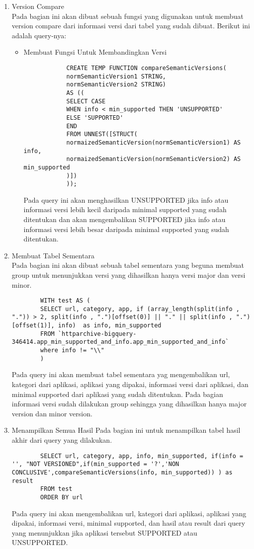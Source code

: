 \begin{enumerate}
\begin{itemize}
	\end{itemize}

	
	\item Version Compare \\
	Pada bagian ini akan dibuat sebuah fungsi yang digunakan untuk membuat version compare dari informasi versi dari tabel yang sudah dibuat. Berikut ini adalah query-nya:
	\begin{itemize}
		\item Membuat Fungsi Untuk Membandingkan Versi
		\begin{lstlisting}
			CREATE TEMP FUNCTION compareSemanticVersions(
			normSemanticVersion1 STRING, 
			normSemanticVersion2 STRING) 
			AS ((
			SELECT CASE 
			WHEN info < min_supported THEN 'UNSUPPORTED'
			ELSE 'SUPPORTED'
			END
			FROM UNNEST([STRUCT(
			normaizedSemanticVersion(normSemanticVersion1) AS info, 
			normaizedSemanticVersion(normSemanticVersion2) AS min_supported
			)])
			));
		\end{lstlisting}
		Pada query ini akan menghasilkan UNSUPPORTED jika info atau informasi versi lebih kecil daripada minimal supported yang sudah ditentukan dan akan mengembalikan SUPPORTED jika info atau informasi versi lebih besar daripada minimal supported yang sudah ditentukan.
	\end{itemize}
		

	\item Membuat Tabel Sementara\\
	Pada bagian ini akan dibuat sebuah tabel sementara yang beguna membuat group untuk menunjukkan versi yang dihasilkan hanya versi major dan versi minor.
	\begin{lstlisting}
		WITH test AS (
		SELECT url, category, app, if (array_length(split(info , ".")) > 2, split(info , ".")[offset(0)] || "." || split(info , ".")[offset(1)], info)  as info, min_supported	
		FROM `httparchive-bigquery-346414.app_min_supported_and_info.app_min_supported_and_info`
		where info != "\\"
		)
	\end{lstlisting}
	Pada query ini akan membuat tabel sementara yag mengembalikan url, kategori dari aplikasi, aplikasi yang dipakai, informasi versi dari aplikasi, dan minimal supported dari aplikasi yang sudah ditentukan. Pada bagian informasi versi sudah dilakukan group sehingga yang dihasilkan hanya major version dan minor version. 
	
	
	\item Menampilkan Semua Hasil
	Pada bagian ini untuk menampilkan tabel hasil akhir dari query yang dilakukan.
	\begin{lstlisting}
		SELECT url, category, app, info, min_supported, if(info = '', "NOT VERSIONED",if(min_supported = '?','NON CONCLUSIVE',compareSemanticVersions(info, min_supported)) ) as  result
		FROM test 
		ORDER BY url
	\end{lstlisting}
Pada query ini akan mengembalikan url, kategori dari aplikasi, aplikasi yang dipakai, informasi versi, minimal supported, dan hasil atau result dari query yang menunjukkan jika aplikasi tersebut SUPPORTED atau UNSUPPORTED.
\end{enumerate}


